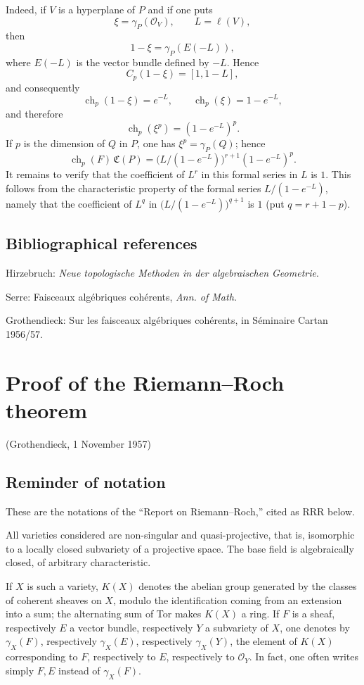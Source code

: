 \documentclass[11pt]{article}
\newcommand{\ch}{\operatorname{ch}}
\newcommand{\RRR}{\mathrm{RRR}}
\providecommand{\ch}{\operatorname{ch}}
\begin{document}
Indeed, if \(V\) is a hyperplane of \(P\) and if one puts
\[
  \xi=\gamma_P(\mathcal O_V),\qquad L=\ell(V),
\]
then
\[
  1-\xi=\gamma_P(E(-L)),
\]
where \(E(-L)\) is the vector bundle defined by \(-L\). Hence
\[
  C_p(1-\xi)=[1,1-L],
\]
and consequently
\[
  \ch_p(1-\xi)=e^{-L},\qquad \ch_p(\xi)=1-e^{-L},
\]
and therefore
\[
  \ch_p(\xi^p)=(1-e^{-L})^p.
\]
If \(p\) is the dimension of \(Q\) in \(P\), one has \(\xi^p=\gamma_P(Q)\); hence
\[
  \ch_p(F)\,\mathfrak C(P)
  =
  \bigl(L/(1-e^{-L})\bigr)^{r+1}(1-e^{-L})^p.
\]
It remains to verify that the coefficient of \(L^r\) in this formal series in \(L\) is \(1\). This follows from the characteristic property of the formal series \(L/(1-e^{-L})\), namely that the coefficient of \(L^q\) in \(\bigl(L/(1-e^{-L})\bigr)^{q+1}\) is \(1\) (put \(q=r+1-p\)).

\subsection*{Bibliographical references}
\begin{enumerate}[label={[\arabic*]}]
\item Hirzebruch: \emph{Neue topologische Methoden in der algebraischen Geometrie}.
\item Serre: Faisceaux algébriques cohérents, \emph{Ann. of Math.}
\item Grothendieck: Sur les faisceaux algébriques cohérents, in Séminaire Cartan 1956/57.
\end{enumerate}

\section*{Proof of the Riemann--Roch theorem}
\begin{center}
(Grothendieck, 1 November 1957)
\end{center}

\subsection*{Reminder of notation}
These are the notations of the ``Report on Riemann--Roch,'' cited as \(\RRR\) below.

All varieties considered are non-singular and quasi-projective, that is, isomorphic to a locally closed subvariety of a projective space. The base field is algebraically closed, of arbitrary characteristic.

If \(X\) is such a variety, \(K(X)\) denotes the abelian group generated by the classes of coherent sheaves on \(X\), modulo the identification coming from an extension into a sum; the alternating sum of Tor makes \(K(X)\) a ring. If \(F\) is a sheaf, respectively \(E\) a vector bundle, respectively \(Y\) a subvariety of \(X\), one denotes by \(\gamma_X(F)\), respectively \(\gamma_X(E)\), respectively \(\gamma_X(Y)\), the element of \(K(X)\) corresponding to \(F\), respectively to \(E\), respectively to \(\mathcal O_Y\). In fact, one often writes simply \(F,E\) instead of \(\gamma_X(F)\).
\end{document}
